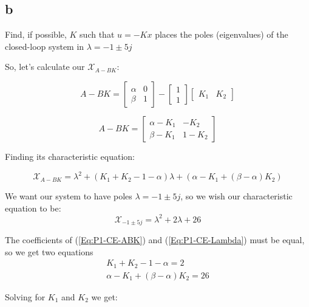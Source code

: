\documentclass[10pt,a4paper]{article}
\begin{document}
\subsection*{b}
Find, if possible, $K$ such that $u = -Kx$ places the poles (eigenvalues) of the closed-loop system in $\lambda=-1 \pm 5j$

So, let's calculate our $\mathcal{X}_{A-BK}$:

\[ A-BK =
\begin{bmatrix}
\alpha & 0 \\
\beta & 1
\end{bmatrix}
- 
\begin{bmatrix}
1\\
1
\end{bmatrix}
\begin{bmatrix}
K_{1} & K_{2}
\end{bmatrix}
\]

\[ A-BK =
\begin{bmatrix}
\alpha - K_{1} & -K_{2} \\
\beta - K_{1} & 1 - K_{2}
\end{bmatrix}
\]

Finding its characteristic equation:

\begin{equation}
\mathcal{X}_{A-BK} = \lambda ^{2} + (K_{1} + K_{2} - 1 - \alpha) \lambda + ( \alpha - K_{1} +(\beta - \alpha)K_{2} )
\label{Eq:P1-CE-ABK}
\end{equation}

We want our system to have poles $\lambda=-1 \pm 5j$, so we wish our characteristic equation to be:
\begin{equation}
\mathcal{X}_{-1 \pm 5j} = \lambda^{2} + 2 \lambda + 26
\label{Eq:P1-CE-Lambda}
\end{equation}

The coefficients of (\ref{Eq:P1-CE-ABK}) and (\ref{Eq:P1-CE-Lambda}) must be equal, so we get two equations
\[
\begin{matrix}
K_{1} + K_{2} - 1 - \alpha = 2 \\
\alpha - K_{1} +(\beta - \alpha)K_{2} = 26
\end{matrix}
\]

Solving for $K_{1}$ and $K_{2}$ we get:
\begin{center}
\end{center}
\end{document}
